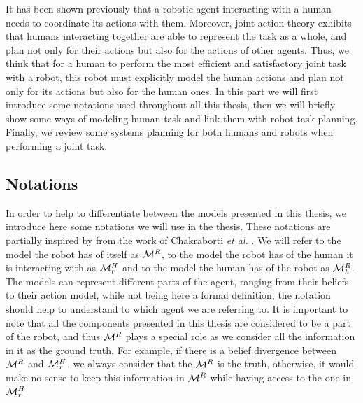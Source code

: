 \documentclass[a4paper,11pt,twoside]{StyleThese}
\begin{document}
It has been shown previously that a robotic agent interacting with a human needs to coordinate its actions with them. Moreover, joint action theory exhibits that humans interacting together are able to represent the task as a whole, and plan not only for their actions but also for the actions of other agents. Thus, we think that for a human to perform the most efficient and satisfactory joint task with a robot, this robot must explicitly model the human actions and plan not only for its actions but also for the human ones. In this part we will first introduce some notations used throughout all this thesis, then we will briefly show some ways of modeling human task and link them with robot task planning. Finally, we review some systems planning for both humans and robots when performing a joint task.

\subsection{Notations}
In order to help to differentiate between the models presented in this thesis, we introduce here some notations we will use in the thesis. These notations are partially inspired by from the work of Chakraborti \textit{et al.} \cite{chakraborti2018human}. We will refer to the model the robot has of itself as $\mathcal{M}^R$, to the model the robot has of the human it is interacting with as $\mathcal{M}^H_r$ and to the model the human has of the robot as $\mathcal{M}^R_h$. The models can represent different parts of the agent, ranging from their beliefs to their action model, while not being here a formal definition, the notation should help to understand to which agent we are referring to. It is important to note that all the components presented in this thesis are considered to be a part of the robot, and thus $\mathcal{M}^R$ plays a special role as we consider all the information in it as the ground truth. For example, if there is a belief divergence between $\mathcal{M}^R$ and $\mathcal{M}^H_r$, we always consider that the $\mathcal{M}^R$ is the truth, otherwise, it would make no sense to keep this information in $\mathcal{M}^R$ while having access to the one in $\mathcal{M}^H_r$.
\end{document}
